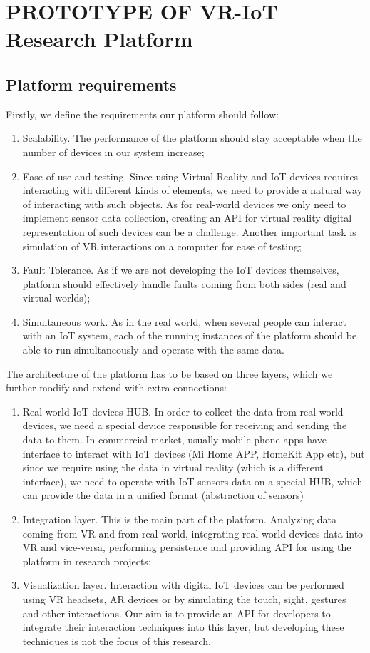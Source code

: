 
\chapter{PROTOTYPE OF VR-IoT Research Platform}

\section{Platform requirements}
Firstly, we define the requirements our platform should follow:
\begin{enumerate}
\item Scalability. The performance of the platform should stay acceptable when the number of devices in our system increase;
\item Ease of use and testing. Since using Virtual Reality and IoT devices requires interacting with different kinds of elements, we need to provide a natural way of interacting with such objects. As for real-world devices we only need to implement sensor data collection, creating an API for virtual reality digital representation of such devices can be a challenge. Another important task is simulation of VR interactions on a computer for ease of testing;
\item Fault Tolerance. As if we are not developing the IoT devices themselves, platform should effectively handle faults coming from both sides (real and virtual worlds);
\item Simultaneous work. As in the real world, when several people can interact with an IoT system, each of the running instances of the platform should be able to run simultaneously and operate with the same data.
\end{enumerate}
The architecture of the platform has to be based on three layers, which we further modify and extend with extra connections: 
\begin{enumerate}
    \item Real-world IoT devices HUB. In order to collect the data from real-world devices, we need a special device responsible for receiving and sending the data to them. In commercial market, usually mobile phone apps have interface to interact with IoT devices (Mi Home APP, HomeKit App etc), but since we require using the data in virtual reality (which is a different interface), we need to operate with IoT sensors data on a special HUB, which can provide the data in a unified format (abstraction of sensors)
    \item Integration layer. This is the main part of the platform. Analyzing data coming from VR and from real world, integrating real-world devices data into VR and vice-versa, performing persistence and providing API for using the platform in research projects;
    \item Visualization layer. Interaction with digital IoT devices can be performed using VR headsets, AR devices or by simulating the touch, sight, gestures and other interactions. Our aim is to provide an API for developers to integrate their interaction techniques into this layer, but developing these techniques is not the focus of this research. 
\end{enumerate}

